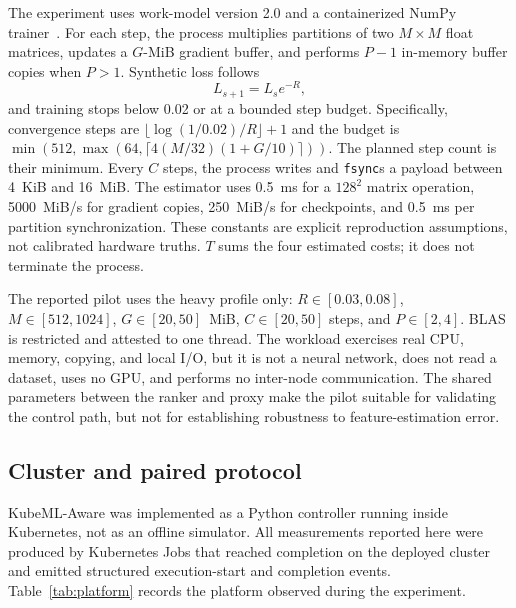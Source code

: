 \documentclass[10pt,journal,compsoc]{IEEEtran}
\newcommand{\system}{KubeML-Aware}
\begin{document}
The experiment uses work-model version 2.0 and a containerized NumPy trainer~\cite{harris2020numpy}. For each step, the process multiplies partitions of two $M\times M$ float matrices, updates a $G$-MiB gradient buffer, and performs $P-1$ in-memory buffer copies when $P>1$. Synthetic loss follows
\begin{equation}
L_{s+1}=L_s e^{-R},
\end{equation}
and training stops below 0.02 or at a bounded step budget. Specifically, convergence steps are $\lfloor\log(1/0.02)/R\rfloor+1$ and the budget is $\min(512,\max(64,\lceil4(M/32)(1+G/10)\rceil))$. The planned step count is their minimum. Every $C$ steps, the process writes and \texttt{fsync}s a payload between 4~KiB and 16~MiB. The estimator uses 0.5~ms for a $128^2$ matrix operation, 5000~MiB/s for gradient copies, 250~MiB/s for checkpoints, and 0.5~ms per partition synchronization. These constants are explicit reproduction assumptions, not calibrated hardware truths. $T$ sums the four estimated costs; it does not terminate the process.

The reported pilot uses the heavy profile only: $R\in[0.03,0.08]$, $M\in[512,1024]$, $G\in[20,50]$~MiB, $C\in[20,50]$ steps, and $P\in[2,4]$. BLAS is restricted and attested to one thread. The workload exercises real CPU, memory, copying, and local I/O, but it is not a neural network, does not read a dataset, uses no GPU, and performs no inter-node communication. The shared parameters between the ranker and proxy make the pilot suitable for validating the control path, but not for establishing robustness to feature-estimation error.

\subsection{Cluster and paired protocol}

\system{} was implemented as a Python controller running inside Kubernetes, not as an offline simulator. All measurements reported here were produced by Kubernetes Jobs that reached completion on the deployed cluster and emitted structured execution-start and completion events. Table~\ref{tab:platform} records the platform observed during the experiment.
\end{document}

